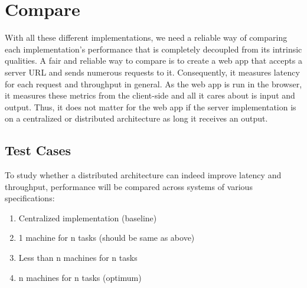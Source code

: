 \documentclass{report}
\begin{document}
\section{Compare}
With all these different implementations, we need a reliable way of comparing each implementation's performance that is completely decoupled from its intrinsic qualities. A fair and reliable way to compare is to create a web app that accepts a server URL and sends numerous requests to it. Consequently, it measures latency for each request and throughput in general. As the web app is run in the browser, it measures these metrics from the client-side and all it cares about is input and output. Thus, it does not matter for the web app if the server implementation is on a centralized or distributed architecture as long it receives an output.

\subsection{Test Cases}
To study whether a distributed architecture can indeed improve latency and throughput, performance will be compared across systems of various specifications:
\begin{enumerate}
  \item Centralized implementation (baseline)
  \item 1 machine for n tasks (should be same as above)
  \item Less than n machines for n tasks
  \item n machines for n tasks (optimum)
\end{enumerate}
\end{document}
